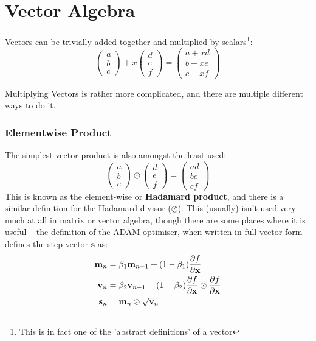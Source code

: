 \documentclass[a4paper,openany,11pt]{book}
\renewcommand\vec[1]{\boldsymbol{\mathbf{#1}}}
\begin{document}
			\section{Vector Algebra}

				Vectors can be trivially added together and multiplied by scalars\footnote{This is in fact one of the 'abstract definitions' of a vector}:
				\begin{equation}
					\begin{pmatrix}
						a \\ b \\ c
					\end{pmatrix} + x \begin{pmatrix}
						d \\ e \\ f
					\end{pmatrix} = \begin{pmatrix}
						a + xd \\ b + xe \\ c + xf
					\end{pmatrix}
				\end{equation}

				Multiplying Vectors is rather more complicated, and there are multiple different ways to do it. 
				
				\subsubsection{Elementwise Product}
					The simplest vector product is also amongst the least used:
					\begin{equation}
						\begin{pmatrix}
							a \\ b \\ c
						\end{pmatrix} \odot \begin{pmatrix}
							d \\ e \\ f
						\end{pmatrix} = \begin{pmatrix}
							ad \\ be \\ cf
						\end{pmatrix} 
					\end{equation}
					This is known as the element-wise or \textbf{Hadamard product}, and there is a similar definition for the Hadamard divisor ($\oslash$). This (usually) isn't used very much at all in matrix or vector algebra, though there are some places where it is useful -- the definition of the ADAM optimiser, when written in full vector form defines the step vector $\vec{s}$ as:
					\begin{align}
						\vec{m}_n & = \beta_1 \vec{m}_{n-1} + (1 - \beta_1) \pdiv{f}{\vec{x}} 
						\\
						\vec{v}_n & = \beta_2 \vec{v}_{n-1} + (1 - \beta_2)  \pdiv{f}{\vec{x}}   \odot \pdiv{f}{\vec{x}} 
						\\
						\vec{s}_n & = \vec{m}_n \oslash \sqrt{\vec{v}_n}
					\end{align}
\end{document}
